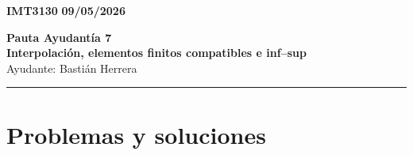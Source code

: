 \documentclass[11pt]{article}
\begin{document}
    \begin{flushleft}
        \small
        \vspace{1pt}
        \textbf{IMT3130} \hfill
        \textbf{09/05/2026}
    \end{flushleft}
    \begin{center}
        \LARGE\textbf{Pauta Ayudantía 7}\\
        \vspace{3pt}
        \normalsize\textbf{Interpolación, elementos finitos compatibles e inf--sup}\\
        \normalsize Ayudante: Bastián Herrera 
        \rule{\textwidth}{0.05mm}
    \end{center}

\section*{Problemas y soluciones}
\end{document}
